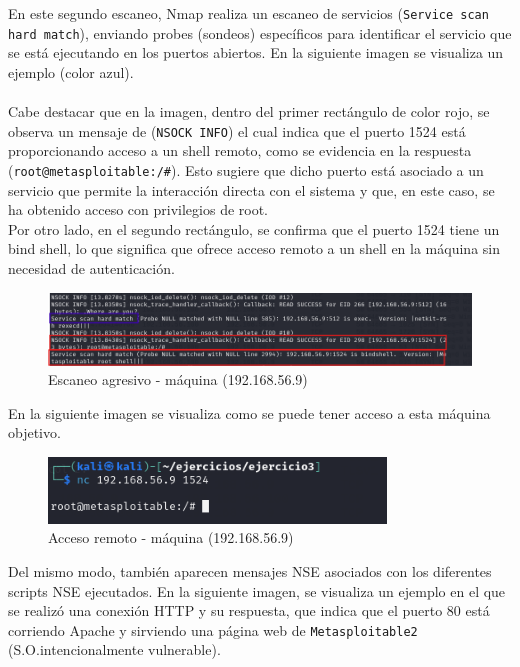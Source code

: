 \documentclass[a4paper,12pt]{article} %
\begin{document}
    En este segundo escaneo, Nmap realiza un escaneo de servicios (\texttt{Service scan hard match}), enviando probes (sondeos) específicos para identificar el servicio que se está ejecutando en los puertos abiertos. En la siguiente imagen se visualiza un ejemplo (color azul). 
    \\ \\
    Cabe destacar que en la imagen, dentro del primer rectángulo de color rojo, se observa un mensaje de (\texttt{NSOCK INFO}) el cual indica que el puerto 1524 está proporcionando acceso a un shell remoto, como se evidencia en la respuesta (\texttt{root@metasploitable:/#}). Esto sugiere que dicho puerto está asociado a un servicio que permite la interacción directa con el sistema y que, en este caso, se ha obtenido acceso con privilegios de root. \\
    Por otro lado, en el segundo rectángulo, se confirma que el puerto 1524 tiene un bind shell, lo que significa que ofrece acceso remoto a un shell en la máquina sin necesidad de autenticación.
\newpage
        \begin{figure} [hp!]
         \centering
         \includegraphics[width=1\textwidth]{Imagenes/servicescan.png}
         \caption{Escaneo agresivo - máquina (192.168.56.9) }
         \label{fig:wireshark2}
        \end{figure}

    En la siguiente imagen se visualiza como se puede tener acceso a esta máquina objetivo.
        \begin{figure} [hp!]
         \centering
         \includegraphics[width=0.8\textwidth]{Imagenes/acceso9.png}
         \caption{Acceso remoto - máquina (192.168.56.9) }
         \label{fig:wireshark2}
        \end{figure}
        
    Del mismo modo, también aparecen mensajes NSE asociados con los diferentes scripts NSE ejecutados. En la siguiente imagen, se visualiza un ejemplo en el que se realizó una conexión HTTP y su respuesta, que indica que el puerto 80 está corriendo Apache y sirviendo una página web de \texttt{Metasploitable2} (S.O.intencionalmente vulnerable).
    
\end{document}
